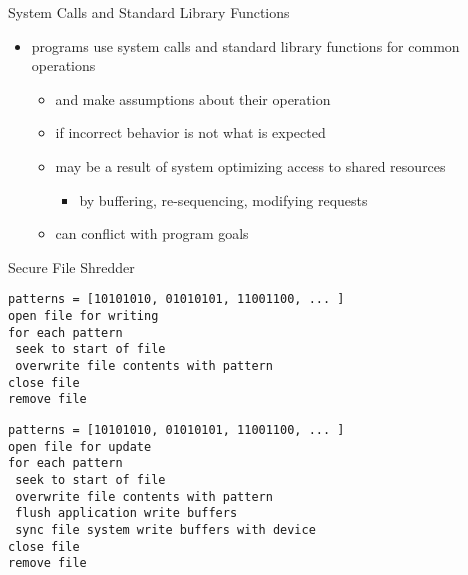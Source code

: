 \documentclass{beamer}
\begin{document}
\begin{frame}{System Calls and Standard Library Functions}
  \begin{itemize}
  \item programs use system calls and standard library
    functions for common operations
    \begin{itemize}
    \item and make assumptions about their operation
    \item if incorrect behavior is not what is expected
    \item may be a result of system optimizing access to
      shared resources
      \begin{itemize}
      \item by buffering, re-sequencing, modifying requests
      \end{itemize}
    \item can conflict with program goals 
    \end{itemize}
  \end{itemize}
\end{frame}


\begin{frame}[fragile]{Secure File Shredder}
  \begin{verbatim}
patterns = [10101010, 01010101, 11001100, ... ]
open file for writing
for each pattern
 seek to start of file
 overwrite file contents with pattern
close file
remove file
  \end{verbatim}
\begin{verbatim}
patterns = [10101010, 01010101, 11001100, ... ]
open file for update
for each pattern
 seek to start of file
 overwrite file contents with pattern
 flush application write buffers
 sync file system write buffers with device
close file
remove file
\end{verbatim}
\end{frame}
\end{document}
